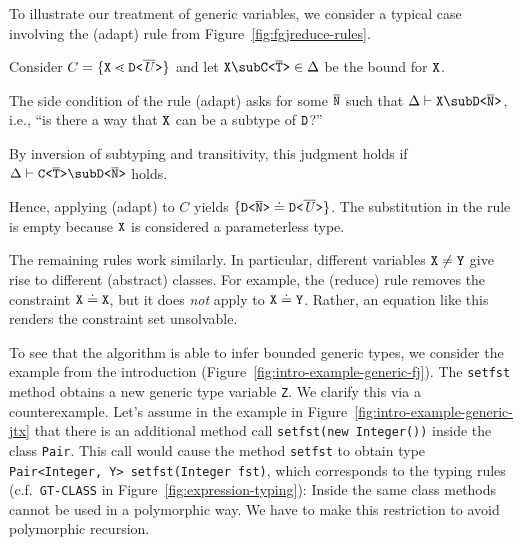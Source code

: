 \begin{example}\label{item:3}
  To illustrate our treatment of generic variables, we consider a
  typical case involving the (adapt) rule from
  Figure~\ref{fig:fgjreduce-rules}.

  Consider $C = \{  {\tt X} \lessdot \mathtt{D \texttt{<} \overline{\mathit{U}} \texttt{>} }  \}$ and let $
  \mv{X} \sub \exptype{C}{\ol{T}} \in \Delta$ be the bound for
  ${\tt X}$.

  The side condition of the rule (adapt) asks for some $\overline{\tt N}$ such
  that
  $\Delta \vdash \mv{X} \sub \exptype{D}{\ol{N}}$, i.e., ``is there a
  way that ${\tt X}$ can be a subtype of ${\tt D}$?''

  By inversion of subtyping and transitivity, this judgment holds if
  $\Delta \vdash \exptype{C}{\ol{T}} \sub \exptype{D}{\ol{N}}$ holds.

  Hence, applying (adapt) to $C$ yields $\{  \mathtt{D \texttt{<} \overline{\tt N} \texttt{>} } \doteq
    \mathtt{D \texttt{<} \overline{\mathit{U}} \texttt{>} }  \}$. The substitution in the rule is empty
  because ${\tt X}$ is considered a parameterless type.

  The remaining rules work similarly. In particular, different
  variables ${\tt X} \ne {\tt Y}$ give rise to different (abstract)
  classes. For example, the (reduce) rule removes the constraint ${\tt X} \doteq
  {\tt X}$, but it does \emph{not} apply to
  ${\tt X} \doteq {\tt Y}$. Rather, an equation like this renders the
  constraint set unsolvable.
\end{example}
\begin{example}
  To see that the algorithm is able to infer bounded generic types, we
  consider the example from the introduction
  (Figure~\ref{fig:intro-example-generic-fj}).
  The \texttt{setfst} method obtains a new generic type variable \texttt{Z}.
  We clarify this via a counterexample.
  Let's assume in the example in
  Figure~\ref{fig:intro-example-generic-jtx} that there is an
  additional method call \texttt{setfst(new Integer())} inside the class \texttt{Pair}.
  This call would cause the method \texttt{setfst} to obtain type
  \texttt{Pair<Integer, Y> setfst(Integer fst)}, which corresponds to
  the typing rules (c.f.\ \texttt{GT-CLASS} in Figure~\ref{fig:expression-typing}):
  Inside the same class methods cannot be used in a polymorphic way.
  We have to make this restriction to avoid polymorphic recursion.
\end{example}
